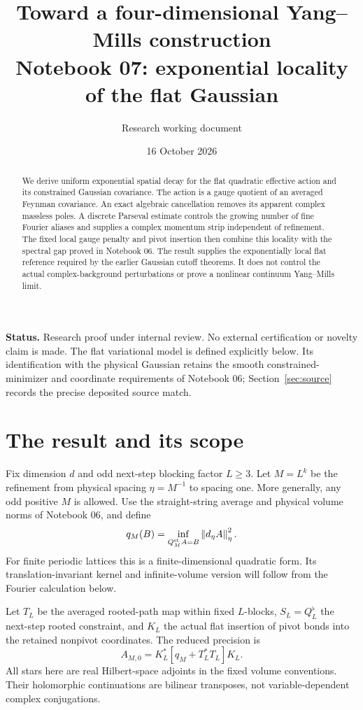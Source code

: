 \documentclass[11pt]{article}
\title{Toward a four-dimensional Yang--Mills construction\\
\large Notebook 07: exponential locality of the flat Gaussian}
\author{Research working document}
\date{16 October 2026}
\theoremstyle{remark}
\newcommand{\norm}[1]{\left\|#1\right\|}
\begin{document}
\maketitle

\begin{abstract}
We derive uniform exponential spatial decay for the flat quadratic
effective action and its constrained Gaussian covariance. The action
is a gauge quotient of an averaged Feynman covariance. An exact
algebraic cancellation removes its apparent complex massless poles.
A discrete Parseval estimate controls the growing number of fine
Fourier aliases and supplies a complex momentum strip independent of
refinement. The fixed local gauge penalty and pivot insertion then
combine this locality with the spectral gap proved in Notebook 06.
The result supplies the exponentially local flat reference required
by the earlier Gaussian cutoff theorems. It does not control the
actual complex-background perturbations or prove a nonlinear continuum
Yang--Mills limit.
\end{abstract}

\noindent\textbf{Status.}
Research proof under internal review. No external certification or
novelty claim is made. The flat variational model is defined explicitly
below. Its identification with the physical Gaussian retains the
smooth constrained-minimizer and coordinate requirements of Notebook 06;
Section~\ref{sec:source} records the precise deposited source match.

\section{The result and its scope}

Fix dimension $d$ and odd next-step blocking factor $L\ge3$.
Let $M=L^k$ be the refinement from physical spacing $\eta=M^{-1}$
to spacing one. More generally, any odd positive $M$ is allowed.
Use the straight-string average and physical volume norms of Notebook 06,
and define
\[
 q_M(B)=\inf_{Q_M^{\rm st}A=B}\norm{d_\eta A}_\eta^2.
\]
For finite periodic lattices this is a finite-dimensional quadratic
form. Its translation-invariant kernel and infinite-volume version
will follow from the Fourier calculation below.

Let $T_L$ be the averaged rooted-path map within fixed $L$-blocks,
$S_L=Q_L^\flat$ the next-step rooted constraint, and $K_L$ the
actual flat insertion of pivot bonds into the retained nonpivot
coordinates. The reduced precision is
\begin{equation}\label{eq:reduced}
 A_{M,0}=K_L^*[q_M+T_L^*T_L]K_L.
\end{equation}
All stars here are real Hilbert-space adjoints in the fixed volume
conventions. Their holomorphic continuations are bilinear transposes,
not variable-dependent complex conjugations.
\end{document}
